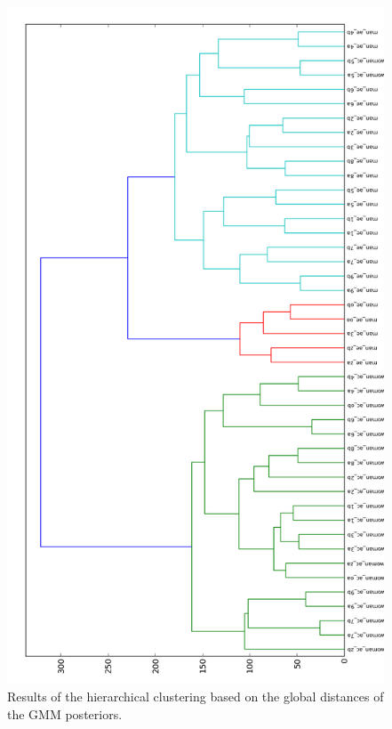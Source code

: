 \documentclass[12pt,a4paper,oneside]{article}
\begin{document}
\begin{figure}
\centering
\includegraphics[scale=0.4]{../dendrogram_probs.png}
\caption{Results of the hierarchical clustering based on the global distances of the GMM posteriors.}
\label{fig:dendro_probs}
\end{figure}
\end{document}
